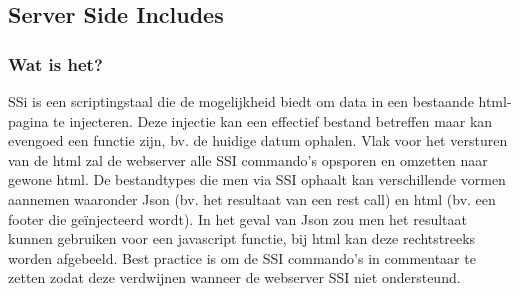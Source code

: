 \documentclass{article}
\begin{document}
	\subsection{Server Side Includes} 
	\subsubsection{Wat is het?}
	SSi is een scriptingstaal die de mogelijkheid biedt om data in een bestaande html-pagina te injecteren. Deze injectie kan een effectief bestand betreffen maar kan evengoed een functie zijn, bv. de huidige datum ophalen. Vlak voor het versturen van de html zal de webserver alle SSI commando's opsporen en omzetten naar gewone html. De bestandtypes die men via SSI ophaalt kan verschillende vormen aannemen waaronder Json (bv. het resultaat van een rest call) en html (bv. een footer die geïnjecteerd wordt). In het geval van Json zou men het resultaat kunnen gebruiken voor een javascript functie, bij html kan deze rechtstreeks worden afgebeeld. Best practice is om de SSI commando's in commentaar te zetten zodat deze verdwijnen wanneer de webserver SSI niet ondersteund.
\end{document}
